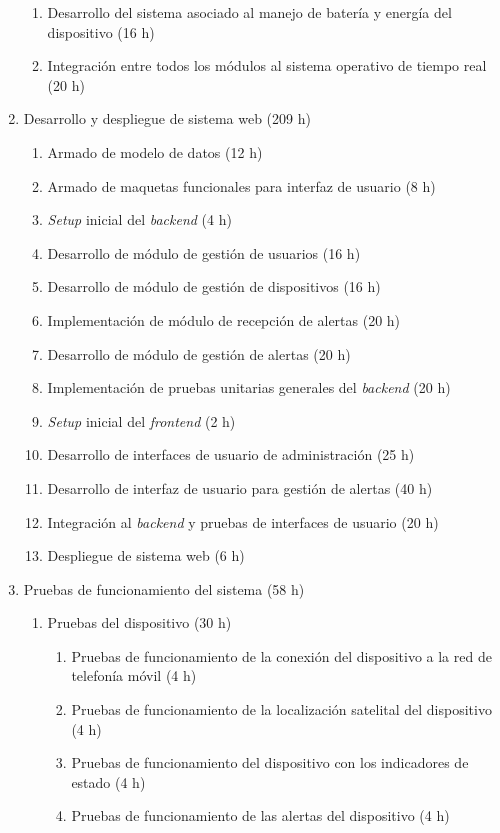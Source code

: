 \documentclass[
11pt, %
]{charter}
\begin{document}
\begin{enumerate}
\begin{enumerate}
	\item Desarrollo del sistema asociado al manejo de batería y energía del dispositivo (16 h)
	\item Integración entre todos los módulos al sistema operativo de tiempo real (20 h)
	\end{enumerate}
\item Desarrollo y despliegue de sistema web (209 h)
	\begin{enumerate}
	\item Armado de modelo de datos (12 h)
	\item Armado de maquetas funcionales para interfaz de usuario (8 h)
	\item \textit{Setup} inicial del \textit{backend} (4 h)
	\item Desarrollo de módulo de gestión de usuarios (16 h)
	\item Desarrollo de módulo de gestión de dispositivos (16 h)
	\item Implementación de módulo de recepción de alertas (20 h)
	\item Desarrollo de módulo de gestión de alertas (20 h)
	\item Implementación de pruebas unitarias generales del \textit{backend} (20 h)
	\item \textit{Setup} inicial del \textit{frontend} (2 h)
	\item Desarrollo de interfaces de usuario de administración (25 h)
	\item Desarrollo de interfaz de usuario para gestión de alertas (40 h)
	\item Integración al \textit{backend} y pruebas de interfaces de usuario (20 h)
	\item Despliegue de sistema web (6 h)
	\end{enumerate}
\item Pruebas de funcionamiento del sistema (58 h)
	\begin{enumerate}
	\item Pruebas del dispositivo (30 h)
	    \begin{enumerate}
	    \item Pruebas de funcionamiento de la conexión del dispositivo a la red de telefonía móvil (4 h)
	    \item Pruebas de funcionamiento de la localización satelital del dispositivo (4 h)
	    \item Pruebas de funcionamiento del dispositivo con los indicadores de estado (4 h)
	    \item Pruebas de funcionamiento de las alertas del dispositivo (4 h)

\end{enumerate}
\end{enumerate}
\end{enumerate}
\end{document}
